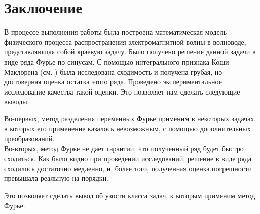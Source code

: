 \chapter*{Заключение}

В процессе выполнения работы была построена математическая модель физического процесса
распространения электромагнитной волны в волноводе, представляющая собой краевую задачу.
Было получено решение данной задачи в виде ряда Фурье по синусам. С помощью интегрального признака
Коши-Маклорена (см. \cite{sendov}) была исследована сходимость и получена грубая, но 
достоверная оценка остатка этого ряда. Проведено экспериментальное исследование качества такой оценки.
Это позволяет нам сделать следующие выводы.

Во-первых, метод разделения переменных Фурье применим в некоторых задачах, в которых его применение казалось
невозможным, с помощью дополнительных преобразований.\\
Во-вторых, метод Фурье не дает гарантии, что полученный ряд будет быстро сходиться. Как было видно при проведении
исследований, решение в виде ряда сходилось достаточно медленно, и, более того, полученная оценка погрешности
превышала реальную на порядки.

Это позволяет сделать вывод об узости класса задач, к которым применим метод Фурье.
